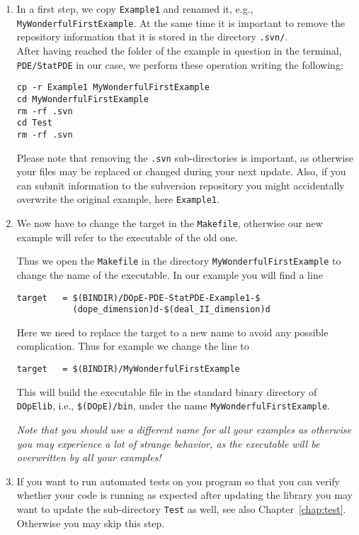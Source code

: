 \begin{enumerate}
 \item In a first step, we copy \texttt{Example1} and renamed it, e.g., 
\texttt{MyWonderfulFirstExample}. At the same time it is important to remove the repository 
information that it is stored in the directory \texttt{.svn/}. \\
After having reached the folder of the example in question in the terminal, 
\texttt{PDE/StatPDE} in our case, we perform these operation writing the following:
\begin{verbatim}
cp -r Example1 MyWonderfulFirstExample
cd MyWonderfulFirstExample
rm -rf .svn
cd Test
rm -rf .svn
\end{verbatim}
Please note that removing the \texttt{.svn} sub-directories is important,
as otherwise your files may be replaced or changed during your next
update. Also, if you can submit information to the subversion repository 
you might accidentally overwrite the original example, here \texttt{Example1}.

\item We now have to change the target in the \texttt{Makefile}, 
  otherwise our new example will refer to the executable of the old one.
  
  Thus we open the \texttt{Makefile} in the directory \texttt{MyWonderfulFirstExample}
  to change the name of the executable. In our example you will find a line
\begin{verbatim}
target   = $(BINDIR)/DOpE-PDE-StatPDE-Example1-$
           (dope_dimension)d-$(deal_II_dimension)d
\end{verbatim}
Here we need to replace the target to a new name to avoid any 
possible complication. Thus for example we change the line to 
\begin{verbatim}
target   = $(BINDIR)/MyWonderfulFirstExample
\end{verbatim}
This will build the executable file in the standard binary directory 
of \texttt{DOpElib}, i.e., \texttt{\$(DOpE)/bin}, under the name 
\texttt{MyWonderfulFirstExample}.

\textit{Note that you should use a different name for all your 
examples as otherwise you may experience a lot of strange behavior, as
the executable will be overwritten by all your examples!}

\item If you want to run automated tests on you program so that you can 
  verify whether your code is running as expected after updating the 
  library you may want to update the sub-directory \texttt{Test} 
  as well, see also Chapter~\ref{chap:test}. Otherwise you may skip this 
  step.


\end{enumerate}
